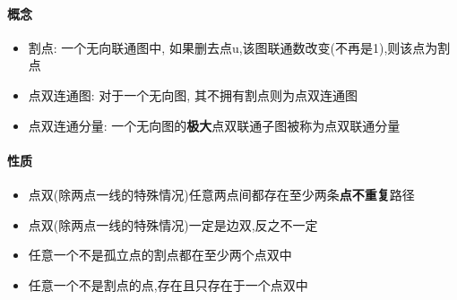 \paragraph{概念}

\begin{itemize}
    \item 割点: 一个无向联通图中, 如果删去点u,该图联通数改变(不再是1),则该点为割点
    \item 点双连通图: 对于一个无向图, 其不拥有割点则为点双连通图
    \item 点双连通分量: 一个无向图的\textbf{极大}点双联通子图被称为点双联通分量
\end{itemize}

\paragraph{性质}

\begin{itemize}
    \item 点双(除两点一线的特殊情况)任意两点间都存在至少两条\textbf{点不重复}路径
    \item 点双(除两点一线的特殊情况)一定是边双,反之不一定
    \item 任意一个不是孤立点的割点都在至少两个点双中
    \item 任意一个不是割点的点,存在且只存在于一个点双中
\end{itemize}